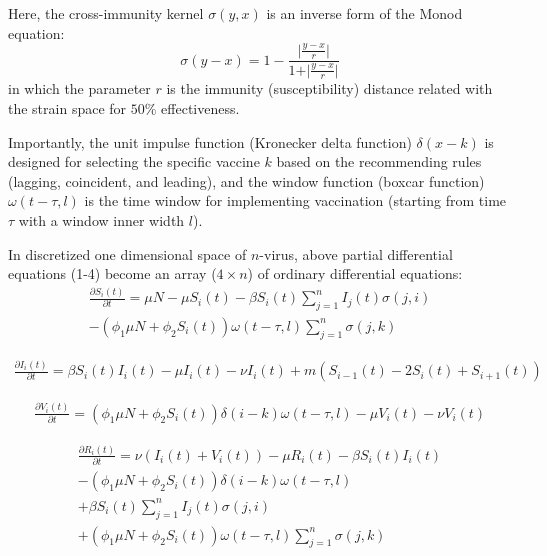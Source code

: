 \documentclass[preprint,12pt]{elsarticle}
\begin{document}
Here, the cross-immunity kernel \(\sigma(y,x)\) is an inverse form of the Monod equation:
\begin{equation}
  \label{eq:Immunity}
  \sigma(y-x) = 1 - \frac{\vert {\frac{y-x}{r}} \vert}{1 + \vert {\frac{y-x}{r}} \vert}
\end{equation}
in which the parameter \(r\) is the immunity (susceptibility) distance related with the strain space for \(50\%\) effectiveness. 

Importantly, the unit impulse function (Kronecker delta function) \(\delta(x-k)\) is designed for selecting the specific vaccine \(k\) based on the recommending rules (lagging, coincident, and leading), and the window function (boxcar function) \(\omega(t-\tau,l)\) is the time window for implementing vaccination (starting from time \(\tau\) with a window inner width \(l\)).


\newpage
In discretized one dimensional space of \(n\)-virus, above partial differential equations (1-4) become an array (\(4 \times n\)) of ordinary differential equations:
\begin{align}
  \label{eq:S}
  \frac{\partial S_i(t)}{\partial t} = \mu N - \mu S_i(t) - \beta S_i(t) \sum_{j=1}^{n} I_j(t)\sigma(j,i)
 \nonumber\\
  -(\phi_{1}\mu N + \phi_{2} S_i(t)) \omega(t-\tau,l) \sum_{j=1}^{n} \sigma(j,k)
\end{align}

\begin{align}
  \label{eq:I}
  \frac{\partial I_i(t)}{\partial t} = \beta S_i(t) I_i(t) - \mu I_i(t) - \nu I_i(t) + m(S_{i-1}(t) - 2S_{i}(t) + S_{i+1}(t))
\end{align}

\begin{align}
  \label{eq:V}
  \frac{\partial V_i(t)}{\partial t} = (\phi_{1}\mu N + \phi_{2} S_i(t)) \delta(i-k)\omega(t-\tau,l) - \mu V_i(t) - \nu V_i(t)
\end{align}

\begin{align}
  \label{eq:R}
  \frac{\partial R_i(t)}{\partial t} = \nu (I_i(t) + V_i(t)) - \mu R_i(t) - \beta S_i(t) I_i(t) 
   \nonumber\\
   -(\phi_{1}\mu N + \phi_{2} S_i(t)) \delta(i-k)\omega(t-\tau,l)
   \nonumber\\
  +\beta S_i(t)\sum_{j=1}^{n} I_j(t)\sigma(j,i)
  \nonumber\\
  +(\phi_{1}\mu N + \phi_{2} S_i(t)) \omega(t-\tau,l) \sum_{j=1}^{n} \sigma(j,k)
\end{align}
\end{document}
